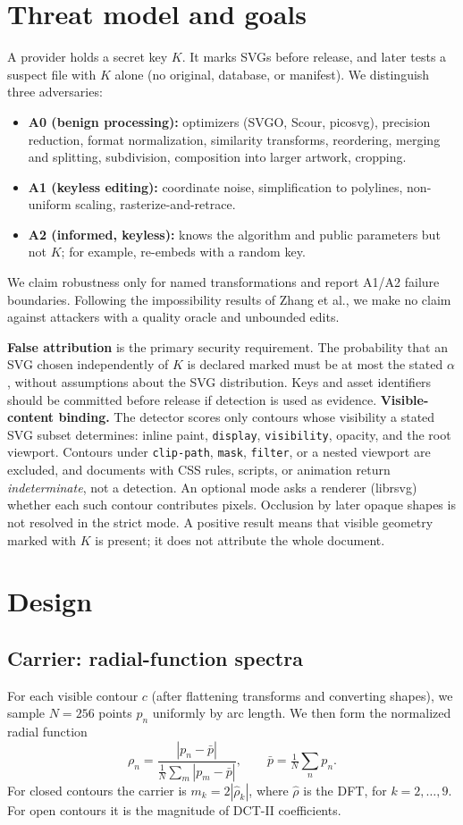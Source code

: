 \documentclass[10pt,twocolumn]{article}
\begin{document}
\section{Threat model and goals}
\label{sec:threat}
A provider holds a secret key $K$. It marks SVGs before release, and later tests a suspect file with $K$ alone (no original, database, or manifest). We distinguish three adversaries:
\begin{itemize}
\item \textbf{A0 (benign processing):} optimizers (SVGO, Scour, picosvg), precision reduction, format normalization, similarity transforms, reordering, merging and splitting, subdivision, composition into larger artwork, cropping.
\item \textbf{A1 (keyless editing):} coordinate noise, simplification to polylines, non-uniform scaling, rasterize-and-retrace.
\item \textbf{A2 (informed, keyless):} knows the algorithm and public parameters but not $K$; for example, re-embeds with a random key.
\end{itemize}
We claim robustness only for named transformations and report A1/A2 failure boundaries. Following the impossibility results of Zhang et al., we make no claim against attackers with a quality oracle and unbounded edits.

\textbf{False attribution} is the primary security requirement. The probability that an SVG chosen independently of $K$ is declared marked must be at most the stated $\alpha$, without assumptions about the SVG distribution. Keys and asset identifiers should be committed before release if detection is used as evidence. \textbf{Visible-content binding.} The detector scores only contours whose visibility a stated SVG subset determines: inline paint, \texttt{display}, \texttt{visibility}, opacity, and the root viewport. Contours under \texttt{clip-path}, \texttt{mask}, \texttt{filter}, or a nested viewport are excluded, and documents with CSS rules, scripts, or animation return \emph{indeterminate}, not a detection. An optional mode asks a renderer (librsvg) whether each such contour contributes pixels. Occlusion by later opaque shapes is not resolved in the strict mode. A positive result means that visible geometry marked with $K$ is present; it does not attribute the whole document.

\section{Design}
\subsection{Carrier: radial-function spectra}
\label{sec:carrier}
For each visible contour $c$ (after flattening transforms and converting shapes), we sample $N=256$ points $p_n$ uniformly by arc length. We then form the normalized radial function
\[
\rho_n=\frac{|p_n-\bar p|}{\frac1N\sum_m|p_m-\bar p|},\qquad \bar p=\tfrac1N\textstyle\sum_n p_n .
\]
For closed contours the carrier is $m_k=2|\hat\rho_k|$, where $\hat\rho$ is the DFT, for $k=2,\dots,9$. For open contours it is the magnitude of DCT-II coefficients.
\end{document}
